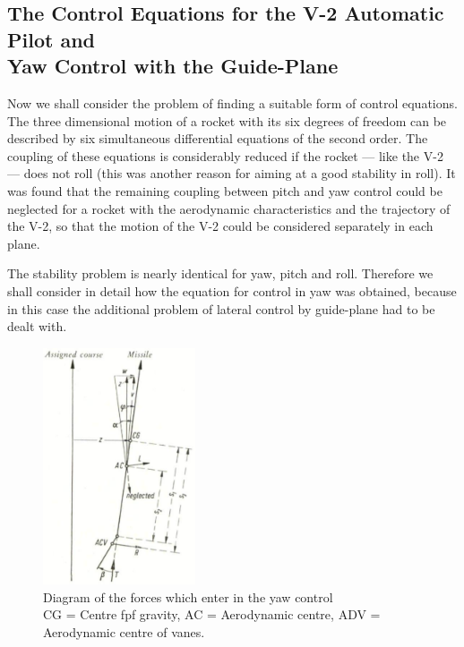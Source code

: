 \documentclass[12pt, a4paper]{article}
\begin{document}
\subsection[The Control Equations for the V-2 Automatic Pilot and Yaw Control with the Guide-Plane]{The Control Equations for the V-2 Automatic Pilot and\\Yaw Control with the Guide-Plane}

Now we shall consider the problem of finding a suitable form of control equations. The three dimensional motion of a rocket with its six degrees of freedom can be described by six simultaneous differential equations of the second order. The coupling of these equations is considerably reduced if the rocket — like the V-2 — does not roll (this was another reason for aiming at a good stability in roll). It was found that the remaining coupling between pitch and yaw control could be neglected for a rocket with the aerodynamic characteristics and the trajectory of the V-2, so that the motion of the V-2 could be considered separately in each plane.

The stability problem is nearly identical for yaw, pitch and roll. Therefore we shall consider in detail how the equation for control in yaw was obtained, because in this case the additional problem of lateral control by guide-plane had to be dealt with.

\begin{figure}[ht]
  \centering
  \includegraphics[width=0.4\textwidth]{figs/ctrl-11.png}
  \caption{Diagram of the forces which enter in the yaw control\\CG = Centre fpf gravity, AC = Aerodynamic centre, ADV = Aerodynamic centre of vanes.}
  \label{fig:11}
\end{figure}
\end{document}
